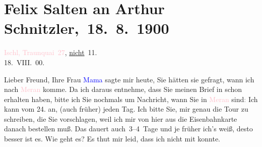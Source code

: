 

\renewcommand{\erwaehntePersonen}{Personen: Caroline Kotter, Ottmar Peter Kotter, Elisabeth Kotter, Leopoldine Müller, Louise Schnitzler}
\renewcommand{\erwaehnteOrte}{Orte: Bad Ischl, Meran, Schruns, Thusis, Traunkai}
\renewcommand{\erwaehnteWerke}{}
\section[ Felix Salten an Arthur Schnitzler, 18. 8. 1900]{Felix Salten an Arthur Schnitzler, 18. 8. 1900}
\nopagebreak{}
\rehead{ }\normalsize\beginnumbering{}
\toendnotes[C]{\smallbreak\pagebreak[2]}
\toendnotes[C]{\smallbreak}
\pstart
           \raggedleft{}{\pb}\textcolor{pink}{Ischl, Traunquai 27}{}\ledrightnote{\textcolor{pink}{Traunkai}}, \uline{nicht} 11. {\\}18. VIII. 00.\pend
           
\pstart
           Lieber Freund, Ihre Frau \textcolor{blue}{Mama}{}\ledrightnote{{$\rightarrow$}\textcolor{blue}{Louise Schnitzler}} sagte mir heute, Sie hätten sie gefragt, wann ich nach \textcolor{pink}{Meran}{}\ledrightnote{\textcolor{pink}{Meran}} komme. Da ich daraus entnehme, dass Sie meinen Brief in
                  \label{K_L03311-1v}\label{K_L03311-1h} schon erhalten haben, bitte ich Sie nochmals um Nachricht, wann Sie in \textcolor{pink}{Meran}{}\ledrightnote{\textcolor{pink}{Meran}} sind\textcolor{gray}{:} Ich kann vom
                  24. an, (auch früher) jeden Tag. Ich bitte Sie, mir
               genau die Tour zu schreiben, die Sie vorschlagen, weil ich mir von hier aus die
               Eisenbahnkarte danach bestellen muß. Das dauert auch 3–4 Tage und je früher ich’s
               weiß, desto besser ist es. Wie geht es? Es thut mir leid, dass ich nicht mit
               konnte.\pend
           
